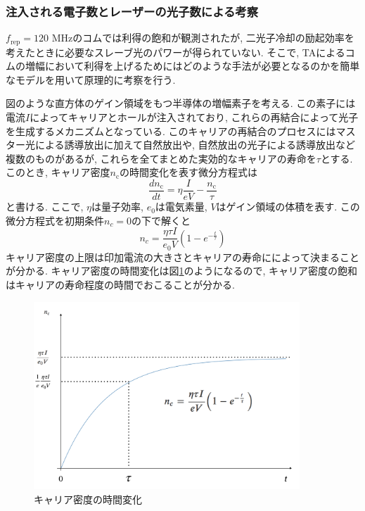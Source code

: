 \documentclass[uplatex, dvipdfmx, a4paper, report, papersize, 11pt]{jsbook}
\begin{document}
\subsubsection{注入される電子数とレーザーの光子数による考察}
$f_{\mathrm{rep}} = 120$ MHzのコムでは利得の飽和が観測されたが, 二光子冷却の励起効率を考えたときに必要なスレーブ光のパワーが得られていない. そこで, TAによるコムの増幅において利得を上げるためにはどのような手法が必要となるのかを簡単なモデルを用いて原理的に考察を行う. \par
図のような直方体のゲイン領域をもつ半導体の増幅素子を考える. この素子には電流$I$によってキャリアとホールが注入されており, これらの再結合によって光子を生成するメカニズムとなっている. このキャリアの再結合のプロセスにはマスター光による誘導放出に加えて自然放出や, 自然放出の光子による誘導放出など複数のものがあるが, これらを全てまとめた実効的なキャリアの寿命を$\tau$とする. このとき, キャリア密度$n_{\mathrm{c}}$の時間変化を表す微分方程式は
\begin{equation}
  \frac{dn_{\mathrm{c}}}{dt} = \eta \frac{I}{eV}-\frac{n_{\mathrm{c}}}{\tau}
\end{equation}
と書ける. ここで, $\eta$は量子効率, $e_0$は電気素量, $V$はゲイン領域の体積を表す. この微分方程式を初期条件$n_c = 0$の下で解くと
\begin{equation}
  n_c = \frac{\eta\tau I}{e_0V}\left(1-e^{-\frac{t}{\tau}}\right)
\end{equation}
キャリア密度の上限は印加電流の大きさとキャリアの寿命にによって決まることが分かる. キャリア密度の時間変化は図\ref{carrier_saturation}のようになるので, キャリア密度の飽和はキャリアの寿命程度の時間でおこることが分かる. \\
\begin{figure}[H]
 \begin{center}
  \includegraphics[width=100mm]{figures/chapter4/carrier_saturation.png}
\end{center}
 \caption{キャリア密度の時間変化}
 \label{carrier_saturation}
\end{figure}
\end{document}
